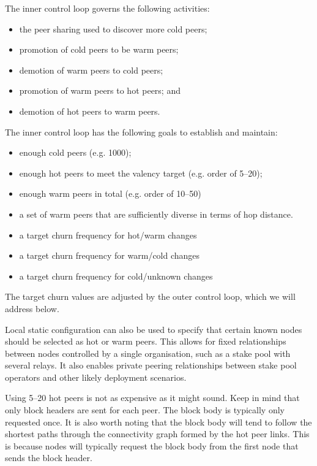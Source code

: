 \documentclass[11pt,a4paper]{article}
\begin{document}
The inner control loop governs the following activities:

\begin{itemize}
\item
  the peer sharing used to discover more cold peers;
\item
  promotion of cold peers to be warm peers;
\item
  demotion of warm peers to cold peers;
\item
  promotion of warm peers to hot peers; and
\item
  demotion of hot peers to warm peers.
\end{itemize}

The inner control loop has the following goals to establish and
maintain:

\begin{itemize}
\item
  enough cold peers (e.g. 1000);
\item
  enough hot peers to meet the valency target (e.g. order of 5--20);
\item
  enough warm peers in total (e.g. order of 10--50)
\item
  a set of warm peers that are sufficiently diverse in terms of hop
  distance.
\item
  a target churn frequency for hot/warm changes
\item
  a target churn frequency for warm/cold changes
\item
  a target churn frequency for cold/unknown changes
\end{itemize}

The target churn values are adjusted by the outer control loop, which we
will address below.

Local static configuration can also be used to specify that certain
known nodes should be selected as hot or warm peers. This allows for
fixed relationships between nodes controlled by a single organisation,
such as a stake pool with several relays. It also enables private
peering relationships between stake pool operators and other likely
deployment scenarios.

Using 5--20 hot peers is not as expensive as it might sound. Keep in
mind that only block headers are sent for each peer. The block body is
typically only requested once. It is also worth noting that the block
body will tend to follow the shortest paths through the connectivity
graph formed by the hot peer links. This is because nodes will typically
request the block body from the first node that sends the block header.
\end{document}
